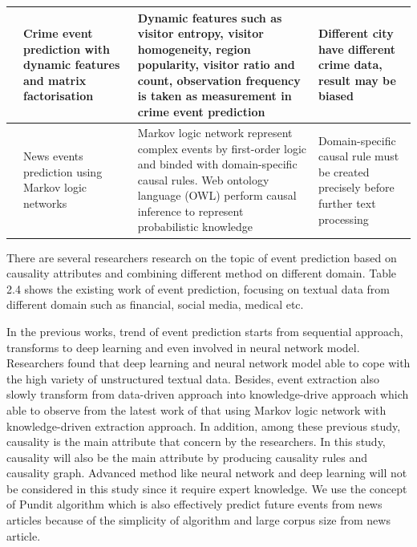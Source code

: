 \documentclass[twoside]{utmthesis}
\begin{document}
\begin{table}[]
{\begin{tabular}{|p{3cm}|p{3cm}|p{5cm}|p{4cm}|}
			\hline
			\citep{rumi2018crime} & Crime event prediction with dynamic features and matrix factorisation   & Dynamic features such as visitor entropy, visitor homogeneity, region popularity, visitor ratio and count, observation frequency is taken as measurement in crime event prediction & Different city have different crime data, result may be biased \\
			\hline
			\citep{dami2018news}   & News events prediction using Markov logic networks & Markov logic network represent complex events by first-order logic and binded with domain-specific causal rules. Web ontology language (OWL) perform causal inference to represent probabilistic knowledge & Domain-specific causal rule must be created precisely before further text processing \\     
			\hline                                                                                                 
	\end{tabular}}
\end{table}

There are several researchers research on the topic 
of event prediction based on causality attributes and combining different method on different domain. Table 2.4 shows the existing work of event prediction, focusing on textual data from different domain such as financial, social media, medical etc. 

In the previous works, trend of event prediction starts from sequential approach, transforms to deep learning and even involved in neural network model. Researchers found that deep learning and neural network model able to cope with the high variety of unstructured textual data. Besides, event extraction also slowly transform from data-driven approach into knowledge-drive approach which able to observe from the latest work of \cite{dami2018news} that using Markov logic network with knowledge-driven extraction approach. In addition, among these previous study, causality is the main attribute that concern by the researchers. In this study, causality will also be the main attribute by producing causality rules and causality graph. Advanced method like neural network and deep learning will not be considered in this study since it require expert knowledge. We use the concept of Pundit algorithm which is also effectively predict future events from news articles because of the simplicity of algorithm and large corpus size from news article.  
\end{document}
